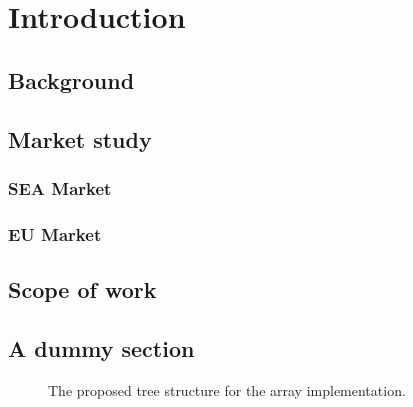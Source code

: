 %
%
\chapter{Introduction}

\section{Background}

\section{Market study}

\subsection{SEA Market}

\subsection{EU Market}

\section{Scope of work}

\section{A dummy section}

\begin{figure}[!h]
	\centering
	\caption{The proposed tree structure for the array implementation.}
\end{figure}

\clearpage